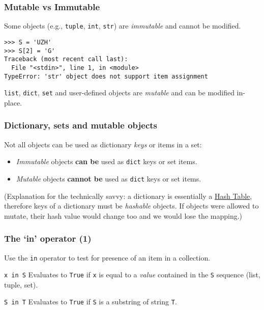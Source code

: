 \documentclass[english,serif,mathserif,xcolor=pdftex,dvipsnames,table]{beamer}
\begin{document}

\begin{frame}[fragile]
  \frametitle{Mutable vs Immutable}
  Some objects (e.g., \texttt{tuple}, \texttt{int}, \texttt{str})
  are \emph{immutable} and cannot be modified.
\begin{lstlisting}
>>> S = 'UZH'
>>> S[2] = 'G'
Traceback (most recent call last):
  File "<stdin>", line 1, in <module>
TypeError: 'str' object does not support item assignment
\end{lstlisting}


  \+
  \texttt{list}, \texttt{dict}, \texttt{set} and user-defined objects
  are \emph{mutable} and can be modified in-place.
\end{frame}

\begin{frame}[fragile]
  \frametitle{Dictionary, sets and mutable objects}

  Not all objects can be used as dictionary \emph{keys} or items in a
  set:
  \begin{itemize}
    \item
      \textit{Immutable} objects \textbf{can be} used as \texttt{dict} keys or set items.
    \item
      \textit{Mutable} objects  \textbf{cannot be} used as \texttt{dict} keys or set items.
    \end{itemize}

    \+
    {\footnotesize
      (Explanation for the technically savvy: a dictionary is
      essentially a \href{http://en.wikipedia.org/wiki/Hash_table}{Hash
        Table}, therefore keys of a dictionary must be \textit{hashable}
      objects.  If objects were allowed to mutate, their hash value
      would change too and we would lose the mapping.)}
\end{frame}


\begin{frame}[fragile]
  \frametitle{The `{\ttfamily\bfseries in}' operator (1)}

  Use the \lstinline|in| operator to test for presence of an item in a
  collection.

  \begin{describe}{\lstinline|x in S|}
    Evaluates to \texttt{True} if \lstinline|x| is equal to a \emph{value}
    contained in the \lstinline|S| sequence (list, tuple, set).
  \end{describe}

  \begin{describe}{\lstinline|S in T|}
    Evaluates to \texttt{True} if \lstinline|S| is a substring of
    string \lstinline|T|.
  \end{describe}

\end{frame}
\end{document}
